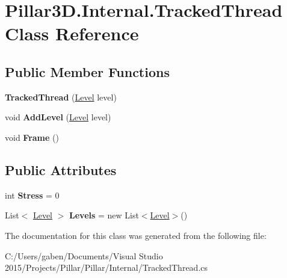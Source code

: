 \hypertarget{class_pillar3_d_1_1_internal_1_1_tracked_thread}{}\section{Pillar3\+D.\+Internal.\+Tracked\+Thread Class Reference}
\label{class_pillar3_d_1_1_internal_1_1_tracked_thread}
\subsection*{Public Member Functions}
\begin{DoxyCompactItemize}
\item 
\mbox{\label{class_pillar3_d_1_1_internal_1_1_tracked_thread_af8e659f6beb78cf418b629170bee6b5f}} 
{\bfseries Tracked\+Thread} (\hyperlink{class_pillar3_d_1_1_level}{Level} level)
\item 
\mbox{\label{class_pillar3_d_1_1_internal_1_1_tracked_thread_ab471add59a8e24860d57a626315ffb82}} 
void {\bfseries Add\+Level} (\hyperlink{class_pillar3_d_1_1_level}{Level} level)
\item 
\mbox{\label{class_pillar3_d_1_1_internal_1_1_tracked_thread_aab614d6a10b824b541ac043be6bc59ff}} 
void {\bfseries Frame} ()
\end{DoxyCompactItemize}
\subsection*{Public Attributes}
\begin{DoxyCompactItemize}
\item 
\mbox{\label{class_pillar3_d_1_1_internal_1_1_tracked_thread_a84fc011ef6591e83bb8dfded470613e3}} 
int {\bfseries Stress} = 0
\item 
\mbox{\label{class_pillar3_d_1_1_internal_1_1_tracked_thread_afd1496fc69ff185beac724a469579eaa}} 
List$<$ \hyperlink{class_pillar3_d_1_1_level}{Level} $>$ {\bfseries Levels} = new List$<$\hyperlink{class_pillar3_d_1_1_level}{Level}$>$()
\end{DoxyCompactItemize}


The documentation for this class was generated from the following file\+:\begin{DoxyCompactItemize}
\item 
C\+:/\+Users/gaben/\+Documents/\+Visual Studio 2015/\+Projects/\+Pillar/\+Pillar/\+Internal/Tracked\+Thread.\+cs\end{DoxyCompactItemize}
